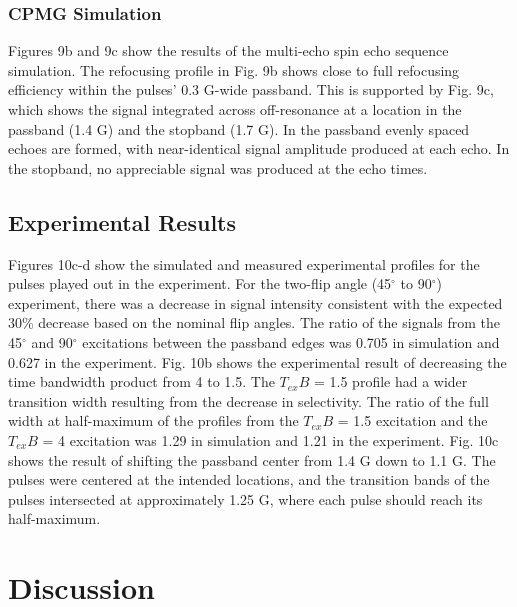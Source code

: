 \documentclass{article}
\begin{document}
\subsubsection{CPMG Simulation}
Figures 9b and 9c show the results of the multi-echo spin echo sequence simulation.
The refocusing profile in Fig. 9b shows close to full refocusing efficiency within the pulses' 0.3 G-wide passband. 
This is supported by Fig. 9c, 
which shows the signal integrated across off-resonance at a location in the passband (1.4 G) and the stopband (1.7 G). 
In the passband evenly spaced echoes are formed, with near-identical signal amplitude produced at each echo. 
In the stopband, no appreciable signal was produced at the echo times. 

\subsection{Experimental Results}
Figures 10c-d show the simulated and measured experimental profiles for the pulses played out in the experiment.
For the two-flip angle (45$^\circ$ to 90$^\circ$) experiment, 
there was a decrease in signal intensity consistent with the expected 30\% decrease based on the nominal flip angles. 
The ratio of the signals from the 45$^\circ$ and 90$^\circ$ excitations between the passband edges was 0.705 in simulation and 0.627 in the experiment.  
Fig. 10b shows the experimental result of decreasing the time bandwidth product from 4 to 1.5. 
The $T_{ex}B$ = 1.5 profile had a wider transition width resulting from the decrease in selectivity.
The ratio of the full width at half-maximum of the profiles from the $T_{ex}B$ = 1.5 excitation and the $T_{ex}B$ = 4 excitation was 1.29 in simulation and 1.21 in the experiment. 
Fig. 10c shows the result of shifting the passband center from 1.4 G down to 1.1 G. 
The pulses were centered at the intended locations, 
and the transition bands of the pulses intersected at approximately 1.25 G, 
where each pulse should reach its half-maximum.

\section{Discussion}


\end{document}
